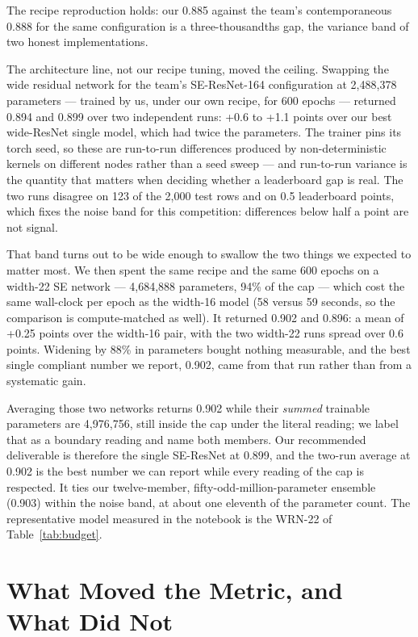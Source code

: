 \documentclass[letterpaper]{article} %
\begin{document}
The recipe reproduction holds: our 0.885 against the team's contemporaneous 0.888 for the same
configuration is a three-thousandths gap, the variance band of two honest implementations.

The architecture line, not our recipe tuning, moved the ceiling. Swapping the wide residual
network for the team's SE-ResNet-164 configuration at 2{,}488{,}378 parameters --- trained by us,
under our own recipe, for 600 epochs --- returned 0.894 and 0.899 over two independent runs: +0.6 to +1.1
points over our best wide-ResNet single model, which had twice the parameters. The trainer pins
its torch seed, so these are run-to-run differences produced by non-deterministic kernels on
different nodes rather than a seed sweep --- and run-to-run variance is the quantity that matters
when deciding whether a leaderboard gap is real. The two runs disagree on 123 of the 2{,}000 test
rows and on 0.5 leaderboard points, which fixes the noise band for this competition: differences
below half a point are not signal.

That band turns out to be wide enough to swallow the two things we expected to matter most. We
then spent the same recipe and the same 600 epochs on a width-22 SE network --- 4{,}684{,}888
parameters, 94\% of the cap --- which cost the same wall-clock per epoch as the width-16 model
(58 versus 59 seconds, so the comparison is compute-matched as well). It returned 0.902 and
0.896: a mean of +0.25 points over the width-16 pair, with the two width-22 runs spread over 0.6
points. Widening by 88\% in parameters bought nothing measurable, and the best single compliant
number we report, 0.902, came from that run rather than from a systematic gain.

Averaging those two networks returns 0.902 while their \emph{summed} trainable parameters are
4{,}976{,}756, still inside the cap under the literal reading; we label that as a boundary
reading and name both members. Our recommended deliverable is therefore the single SE-ResNet at
0.899, and the two-run average at 0.902 is the best number we can report while every reading of
the cap is respected. It ties our twelve-member, fifty-odd-million-parameter ensemble (0.903)
within the noise band, at about one eleventh of the parameter count. The representative model
measured in the notebook is the WRN-22 of Table~\ref{tab:budget}.

\section{What Moved the Metric, and What Did Not}
\label{sec:analysis}
\end{document}

